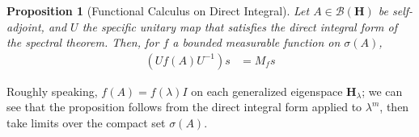 \documentclass[12pt]{extarticle}
\theoremstyle{plain}
\newtheorem*{proposition}{Proposition}%
\theoremstyle{definition}
\theoremstyle{remark}
\begin{document}
  \begin{proposition}[Functional Calculus on Direct Integral]
  Let $A\in \mathcal{B}\left(\mathbf{H}\right)$ be self-adjoint, and $U$ the specific unitary map that satisfies the direct integral form of the spectral theorem. Then, for $f$ a bounded measurable function on $\sigma(A)$,
  \begin{align*}
    \left(Uf(A)U^{-1}\right)s &= M_{f}s
  \end{align*}
  \end{proposition}
  Roughly speaking, $f(A) = f(\lambda)I$ on each generalized eigenspace $\mathbf{H}_{\lambda}$; we can see that the proposition follows from the direct integral form applied to $\lambda^{m}$, then take limits over the compact set $\sigma(A)$.
\end{document}
